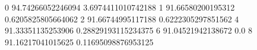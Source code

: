 0 94.74266052246094 3.6974411010742188
1 91.66580200195312 0.6205825805664062
2 91.66744995117188 0.6222305297851562
4 91.33351135253906 0.28829193115234375
6 91.04521942138672 0.0
8 91.16217041015625 0.11695098876953125
